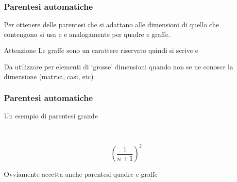 \begin{frame}
  \frametitle{Parentesi automatiche}
	Per ottenere delle parentesi che si adattano alle dimensioni di quello che contengono si usa  e  e analogamente per quadre e graffe.
	\begin{block}{Attenzione}
		Le graffe sono un carattere riservato quindi si scrive  e 
	\end{block}
  \bigskip
	Da utilizzare per elementi di `grosse' dimensioni quando non se ne conosce la dimensione (matrici, casi, etc)
\end{frame}
\begin{frame}
  \frametitle{Parentesi automatiche}
	Un esempio di parentesi grande
	\begin{LaTeXcode}
		\\[\n
		 \hspace*{5ex}\alert{\\left(}\\frac\{1\}\{n+1\}\alert{\\right)}\textasciicircum 2\n
		\\]
	\end{LaTeXcode}
	\begin{LaTeXoutput}
		\[
			\left(\frac{1}{n+1}\right)^2
		\]
	\end{LaTeXoutput}
	Ovviamente  accetta anche parentesi quadre e graffe
\end{frame}
